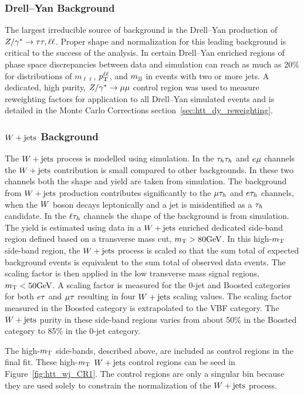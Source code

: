 \subsubsection{Drell--Yan Background}
The largest irreducible source of background is the Drell--Yan production
of $Z/\gamma^*\to\tau\tau, \ell\ell$. Proper shape and normalization for this
leading background is critical to the success of the analysis.
In certain Drell--Yan enriched regions of phase space discrepancies between
data and simulation can reach as much as 20\% for distributions of $m_{\ell\ell}$,
$p_\mathrm{T}^{\ell\ell}$, and $m_\mathrm{jj}$ in events with two or more jets.
A dedicated, high purity, $Z/\gamma^*\to\mu\mu$ control region was
used to measure reweighting factors for application to all Drell--Yan
simulated events and is detailed in the Monte Carlo Corrections 
section~\ref{sec:htt_dy_reweighting}.

\subsubsection{$W+\text{jets}$ Background}
The $W+\text{jets}$ process is modelled using simulation.
In the $\tau_{h}\tau_{h}$ and $e\mu$ channels the $W+\text{jets}$ contribution 
is small compared to other backgrounds. In these two channels both the shape and 
yield are taken from simulation.
The background from $W+\text{jets}$ production contributes significantly to the
$\mu\tau_{h}$ and $e\tau_{h}$ channels, when the $W$ boson decays leptonically and
a jet is misidentified as a $\tau_{h}$ candidate. In the $\ell\tau_{h}$ channels
the shape of the background is from simulation. The yield is estimated 
using data in a $W+\text{jets}$ enriched dedicated side-band region defined
based on a transverse mass cut, $m_\mathrm{T} > 80\mathrm{GeV}$. In this high-$m_\mathrm{T}$ side-band region, the $W+\text{jets}$
process is scaled so that the sum total of expected background events is equivalent
to the sum total of observed data events. The scaling factor is then applied
in the low transverse mass signal regions, $m_\mathrm{T} < 50\mathrm{GeV}$. A scaling factor
is measured for the 0-jet and Boosted categories for both $e\tau$ and $\mu\tau$ resulting
in four $W+\text{jets}$ scaling values. The scaling factor measured in the Boosted
category is extrapolated to the VBF category. The $W+\text{jets}$ purity in these
side-band regions varies from about 50\% in the Boosted category to 85\% in the 0-jet category.

The high-$m_\mathrm{T}$ side-bands, described above, are included as control regions in the final fit.
These high-$m_\mathrm{T}$ $W+\text{jets}$ control regions can be seed in Figure~\ref{fig:htt_wj_CR1}.
The control regions are only a singular bin because they are used solely to constrain 
the normalization of the $W+\text{jets}$ process.

